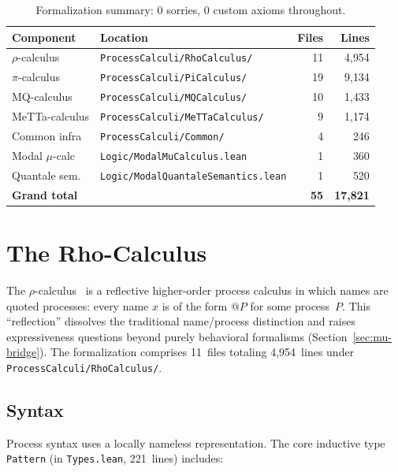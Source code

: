 \documentclass[11pt]{article}
\theoremstyle{definition}
\theoremstyle{remark}
\begin{document}
\begin{table}[t]
\centering
\small
\begin{tabular}{llrr}
\toprule
\textbf{Component} & \textbf{Location} & \textbf{Files} & \textbf{Lines} \\
\midrule
$\rho$-calculus  & \texttt{ProcessCalculi/RhoCalculus/} & 11 & 4{,}954 \\
$\pi$-calculus   & \texttt{ProcessCalculi/PiCalculus/}  & 19 & 9{,}134 \\
MQ-calculus      & \texttt{ProcessCalculi/MQCalculus/}  & 10 & 1{,}433 \\
MeTTa-calculus   & \texttt{ProcessCalculi/MeTTaCalculus/} &  9 & 1{,}174 \\
Common infra     & \texttt{ProcessCalculi/Common/}      &  4 &   246 \\
Modal $\mu$-calc & \texttt{Logic/ModalMuCalculus.lean}   &  1 &   360 \\
Quantale sem.    & \texttt{Logic/ModalQuantaleSemantics.lean} & 1 & 520 \\
\midrule
\textbf{Grand total} & & \textbf{55} & \textbf{17{,}821} \\
\bottomrule
\end{tabular}
\caption{Formalization summary: 0 sorries, 0 custom axioms throughout.}
\label{tab:summary}
\end{table}


\section{The Rho-Calculus}
\label{sec:rho}

The $\rho$-calculus~\cite{MeredithRadestock2005} is a reflective
higher-order process calculus in which names are quoted processes:
every name $x$ is of the form $\mathsf{@}P$ for some process~$P$.
This ``reflection'' dissolves the traditional name/process distinction
and raises expressiveness questions beyond purely behavioral
formalisms (Section~\ref{sec:mu-bridge}).
The formalization comprises 11~files totaling 4{,}954~lines under
\texttt{ProcessCalculi/RhoCalculus/}.

\subsection{Syntax}

Process syntax uses a locally nameless representation.  The core
inductive type \texttt{Pattern} (in \texttt{Types.lean}, 221~lines)
includes:
\end{document}
